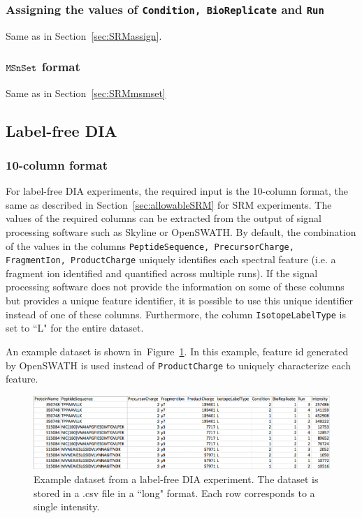 \documentclass[11pt]{article}
\def\figref#1{Figure~\ref{fig:#1}}
\def\secref#1{Section~\ref{sec:#1}}
\begin{document}
\subsubsection{Assigning the values of {\tt Condition, BioReplicate} and {\tt Run}}

Same as in \secref{SRMassign}.


\subsubsection{$\tt{MSnSet}$ format } 

Same as in \secref{SRMmsmset}



\subsection{Label-free DIA} 

\subsubsection{10-column format}

For label-free DIA experiments, the required input is the 10-column format, the same as described in \secref{allowableSRM} for SRM experiments. The values of the required columns can be extracted from the output of signal processing software such as Skyline or OpenSWATH.  By default, the combination of the values in the columns {\tt PeptideSequence, PrecursorCharge, FragmentIon, ProductCharge} uniquely identifies each spectral feature (i.e. a fragment ion identified and quantified across multiple runs). If the signal processing software does not provide the information on some of these columns but provides a unique feature identifier, it is possible to use this unique identifier instead of one of these columns. Furthermore, the column {\tt IsotopeLabelType} is set to ``L" for the entire dataset.

An example dataset is shown in~\figref{inputDIA}. In this example, feature id generated by OpenSWATH is used instead of {\tt ProductCharge} to uniquely characterize each feature.


\begin{figure}[!h]
\centering 
\includegraphics[totalheight=1.5in, width=5.5in]{required_DIA.png}
\vspace{-0.3cm}
\caption{\small Example dataset from a label-free DIA experiment. The dataset is stored in a .csv file in a ``long" format.  Each row corresponds to a single intensity.  
\label{fig:inputDIA}}
\end{figure}
\end{document}
